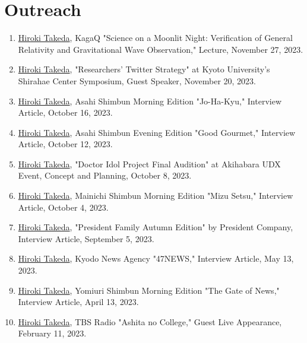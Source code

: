 \documentclass[uplatex, 12pt]{article}
\begin{document}
\section*{Outreach}

\begin{enumerate}

\item \uline{Hiroki Takeda}, KagaQ "Science on a Moonlit Night: Verification of General Relativity and Gravitational Wave Observation," Lecture, November 27, 2023.\\

\item \uline{Hiroki Takeda}, "Researchers' Twitter Strategy" at Kyoto University's Shirahae Center Symposium, Guest Speaker, November 20, 2023.\\

\item \uline{Hiroki Takeda}, Asahi Shimbun Morning Edition "Jo-Ha-Kyu," Interview Article, October 16, 2023.\\

\item \uline{Hiroki Takeda}, Asahi Shimbun Evening Edition "Good Gourmet," Interview Article, October 12, 2023.\\

\item \uline{Hiroki Takeda}, "Doctor Idol Project Final Audition" at Akihabara UDX Event, Concept and Planning, October 8, 2023.\\

\item \uline{Hiroki Takeda}, Mainichi Shimbun Morning Edition "Mizu Setsu," Interview Article, October 4, 2023.\\

\item \uline{Hiroki Takeda}, "President Family Autumn Edition" by President Company, Interview Article, September 5, 2023.\\

\item \uline{Hiroki Takeda}, Kyodo News Agency "47NEWS," Interview Article, May 13, 2023.\\

\item \uline{Hiroki Takeda}, Yomiuri Shimbun Morning Edition "The Gate of News," Interview Article, April 13, 2023.\\

\item \uline{Hiroki Takeda}, TBS Radio "Ashita no College," Guest Live Appearance, February 11, 2023.\\


\end{enumerate}
\end{document}
